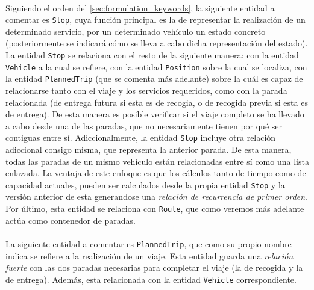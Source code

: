 \documentclass{subfiles}
\begin{document}
          \paragraph{}
          Siguiendo el orden del \cref{sec:formulation_keywords}, la siguiente entidad a comentar es \texttt{Stop}, cuya función principal es la de representar la realización de un determinado servicio, por un determinado vehículo un estado concreto (posteriormente se indicará cómo se lleva a cabo dicha representación del estado). La entidad \texttt{Stop} se relaciona con el resto de la siguiente manera: con la entidad \texttt{Vehicle} a la cual se refiere, con la entidad \texttt{Position} sobre la cual se localiza, con la entidad \texttt{PlannedTrip} (que se comenta más adelante) sobre la cuál es capaz de relacionarse tanto con el viaje y los servicios requeridos, como con la parada relacionada (de entrega futura si esta es de recogia, o de recogida previa si esta es de entrega). De esta manera es posible verificar si el viaje completo se ha llevado a cabo desde una de las paradas, que no necesariamente tienen por qué ser contiguas entre sí. Adiccionalmente, la entidad \texttt{Stop} incluye otra relación adiccional consigo misma, que representa la anterior parada. De esta manera, todas las paradas de un mismo vehículo están relacionadas entre sí como una lista enlazada. La ventaja de este enfoque es que los cálculos tanto de tiempo como de capacidad actuales, pueden ser calculados desde la propia entidad \texttt{Stop} y la versión anterior de esta generandose una \emph{relación de recurrencia de primer orden}. Por último, esta entidad se relaciona con \texttt{Route}, que como veremos más adelante actúa como contenedor de paradas.

          \paragraph{}
          La siguiente entidad a comentar es \texttt{PlannedTrip}, que como su propio nombre indica se refiere a la realización de un viaje. Esta entidad guarda una \emph{relación fuerte} con las dos paradas necesarias para completar el viaje (la de recogida y la de entrega). Además, esta relacionada con la entidad \texttt{Vehicle} correspondiente.
\end{document}
